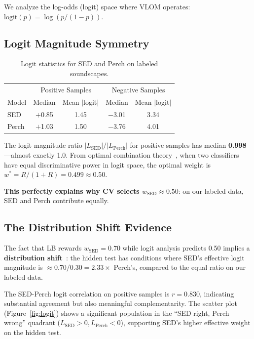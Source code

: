 \documentclass[a4paper,11pt]{article}
\begin{document}
We analyze the log-odds (logit) space where VLOM operates: $\text{logit}(p) = \log(p/(1-p))$.

\subsection{Logit Magnitude Symmetry}

\begin{table}[h]
\centering
\caption{Logit statistics for SED and Perch on labeled soundscapes.}
\begin{tabular}{lcccc}
\toprule
 & \multicolumn{2}{c}{Positive Samples} & \multicolumn{2}{c}{Negative Samples} \\
Model & Median & Mean $|$logit$|$ & Median & Mean $|$logit$|$ \\
\midrule
SED & $+$0.85 & 1.45 & $-$3.01 & 3.34 \\
Perch & $+$1.03 & 1.50 & $-$3.76 & 4.01 \\
\bottomrule
\end{tabular}
\label{tab:logit}
\end{table}

The logit magnitude ratio $|L_\text{SED}| / |L_\text{Perch}|$ for positive samples has median \textbf{0.998}---almost exactly 1.0.
From optimal combination theory~\citep{kittler1998combining}, when two classifiers have equal discriminative power in logit space,
the optimal weight is $w^* = R/(1+R) = 0.499 \approx 0.50$.

\textbf{This perfectly explains why CV selects $w_\text{SED} \approx 0.50$}: on our labeled data, SED and Perch contribute equally.

\subsection{The Distribution Shift Evidence}

The fact that LB rewards $w_\text{SED} = 0.70$ while logit analysis predicts 0.50 implies a \textbf{distribution shift}~\citep{ben2010theory}:
the hidden test has conditions where SED's effective logit magnitude is $\approx 0.70/0.30 = 2.33\times$ Perch's, compared to the equal ratio on our labeled data.

The SED-Perch logit correlation on positive samples is $r=0.830$, indicating substantial agreement but also meaningful complementarity.
The scatter plot (Figure~\ref{fig:logit}) shows a significant population in the ``SED right, Perch wrong'' quadrant ($L_\text{SED} > 0, L_\text{Perch} < 0$),
supporting SED's higher effective weight on the hidden test.
\end{document}
